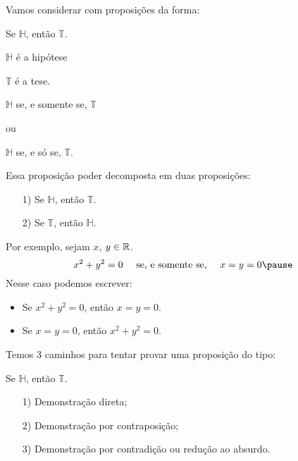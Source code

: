 \documentclass{beamer}
\begin{document}
    \begin{frame}
        Vamos considerar com proposi\c{c}\~oes da forma:\pause

        \begin{center}
            Se $\mathbb{H}$, ent\~ao $\mathbb{T}$.\pause
        \end{center}

        $\mathbb{H}$ \'e a hip\'otese\pause

        $\mathbb{T}$ é a tese.\pause

        \begin{center}
            $\mathbb{H}$ se, e somente se, $\mathbb{T}$\pause

            ou

            $\mathbb{H}$ se, e s\'o se, $\mathbb{T}$.\pause
        \end{center}

        Essa proposi\c{c}\~ao poder decomposta em duas proposi\c{c}\~oes:\pause
        \begin{itemize}
            \item[1)] Se $\mathbb{H}$, ent\~ao $\mathbb{T}$.\pause
            \item[2)] Se $\mathbb{T}$, ent\~ao $\mathbb{H}$.
        \end{itemize}
    \end{frame}

    \begin{frame}
        Por exemplo, sejam $x$, $y \in \mathbb{R}$.\pause
        \[
            x^2 + y^2 = 0 \quad\mbox{ se, e somente se, }\quad x = y = 0\pause
        \]
        Nesse caso podemos escrever:
        \begin{itemize}
            \item Se $x^2 + y^2 = 0$, então $x = y = 0$.\pause
            \item Se $x = y = 0$, então $x^2 + y^2 = 0$.
        \end{itemize}
    \end{frame}

    \begin{frame}
        Temos 3 caminhos para tentar provar uma proposição do tipo:
        \begin{center}
            Se $\mathbb{H}$, ent\~ao $\mathbb{T}$.\pause
        \end{center}

        \begin{itemize}
            \item[1)] Demonstra\c{c}\~ao direta;\pause
            \item[2)] Demonstra\c{c}\~ao por contraposi\c{c}\~ao;\pause
            \item[3)] Demonstra\c{c}\~ao por contradi\c{c}\~ao ou redu\c{c}\~ao ao absurdo.\pause
        \end{itemize}
    \end{frame}
\end{document}
